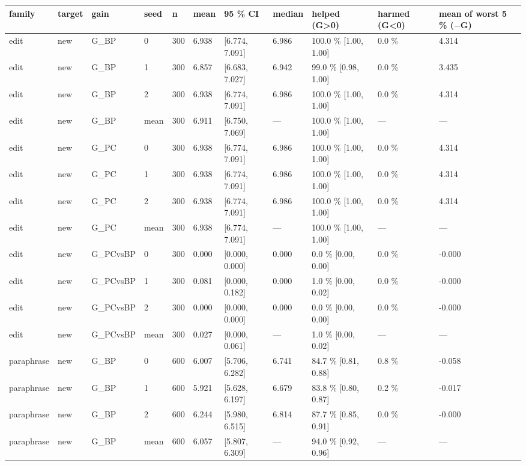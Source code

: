 \documentclass[10pt,a4paper]{article}
\begin{document}
\begin{center}\tiny
\begin{tabularx}{\textwidth}{@{}p{}XXXXXXXXXX@{}}
\toprule
family & target & gain & seed & n & mean & 95 \% CI & median & helped (G>0) & harmed (G<0) & mean of worst 5 \% ($-$G) \\ \midrule
edit & new & G\_BP & 0 & 300 & 6.938 & [6.774, 7.091] & 6.986 & 100.0 \% [1.00, 1.00] & 0.0 \% & 4.314 \\
edit & new & G\_BP & 1 & 300 & 6.857 & [6.683, 7.027] & 6.942 & 99.0 \% [0.98, 1.00] & 0.0 \% & 3.435 \\
edit & new & G\_BP & 2 & 300 & 6.938 & [6.774, 7.091] & 6.986 & 100.0 \% [1.00, 1.00] & 0.0 \% & 4.314 \\
edit & new & G\_BP & mean & 300 & 6.911 & [6.750, 7.069] & — & 100.0 \% [1.00, 1.00] & — & — \\
edit & new & G\_PC & 0 & 300 & 6.938 & [6.774, 7.091] & 6.986 & 100.0 \% [1.00, 1.00] & 0.0 \% & 4.314 \\
edit & new & G\_PC & 1 & 300 & 6.938 & [6.774, 7.091] & 6.986 & 100.0 \% [1.00, 1.00] & 0.0 \% & 4.314 \\
edit & new & G\_PC & 2 & 300 & 6.938 & [6.774, 7.091] & 6.986 & 100.0 \% [1.00, 1.00] & 0.0 \% & 4.314 \\
edit & new & G\_PC & mean & 300 & 6.938 & [6.774, 7.091] & — & 100.0 \% [1.00, 1.00] & — & — \\
edit & new & G\_PCvsBP & 0 & 300 & 0.000 & [0.000, 0.000] & 0.000 & 0.0 \% [0.00, 0.00] & 0.0 \% & -0.000 \\
edit & new & G\_PCvsBP & 1 & 300 & 0.081 & [0.000, 0.182] & 0.000 & 1.0 \% [0.00, 0.02] & 0.0 \% & -0.000 \\
edit & new & G\_PCvsBP & 2 & 300 & 0.000 & [0.000, 0.000] & 0.000 & 0.0 \% [0.00, 0.00] & 0.0 \% & -0.000 \\
edit & new & G\_PCvsBP & mean & 300 & 0.027 & [0.000, 0.061] & — & 1.0 \% [0.00, 0.02] & — & — \\
paraphrase & new & G\_BP & 0 & 600 & 6.007 & [5.706, 6.282] & 6.741 & 84.7 \% [0.81, 0.88] & 0.8 \% & -0.058 \\
paraphrase & new & G\_BP & 1 & 600 & 5.921 & [5.628, 6.197] & 6.679 & 83.8 \% [0.80, 0.87] & 0.2 \% & -0.017 \\
paraphrase & new & G\_BP & 2 & 600 & 6.244 & [5.980, 6.515] & 6.814 & 87.7 \% [0.85, 0.91] & 0.0 \% & -0.000 \\
paraphrase & new & G\_BP & mean & 600 & 6.057 & [5.807, 6.309] & — & 94.0 \% [0.92, 0.96] & — & — \\

\end{tabularx}
\end{center}
\end{document}

